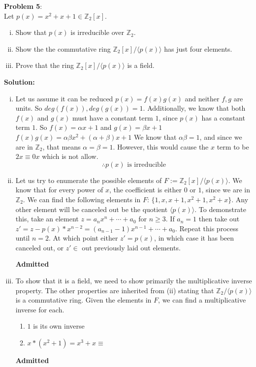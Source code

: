 \documentclass[11pt]{article}
\newcommand{\prob}[3]{\begin{flushleft}
        \textbf{Problem #1}: \\
        #2 
		\textbf{Solution:} 
		#3

\end{flushleft}}
\newcommand{\admit}{
  \begin{flushright}
    \textbf{Admitted}
  \end{flushright}
}
\newcommand{\lr}[1]{
  \langle #1 \rangle
}
\begin{document}
\prob{5}{
Let $p(x) = x^2 + x + 1 \in \mathbb{Z}_2[x]$.
\begin{enumerate}[(i)]
  \item Show that $p(x)$ is irreducible over $\mathbb{Z}_2$.
  \item Show the the commutative ring $\mathbb{Z}_2[x] / \lr{p(x)}$ has just four elements.
  \item Prove that the ring $\mathbb{Z}_2[x] / \lr{p(x)}$ is a field.
\end{enumerate}
}{
\begin{enumerate}[(i)]
  \item Let us assume it can be reduced $p(x) = f(x)g(x)$ and neither $f,g$ are units.
        So $deg(f(x)), deg(g(x)) = 1$.
        Additionally, we know that both $f(x)$ and $g(x)$ must have a constant term $1$, since $p(x)$ has a constant term $1$.
        So $f(x) = \alpha x + 1$ and $g(x) = \beta x + 1$
        $f(x) g(x) = \alpha \beta x^2 + (\alpha + \beta) x + 1$
        We know that $\alpha \beta = 1$, and since we are in $\mathbb{Z}_2$, that means $\alpha = \beta = 1$. However, this would cause the $x$ term to be $2x \equiv 0x$ which is not allow.
        $$\therefore \text{$p(x)$ is irreducible}$$

  \item Let us try to enumerate the possible elements of $F := \mathbb{Z}_2[x] / \lr{p(x)}$.
        We know that for every power of $x$, the coefficient is either $0$ or $1$, since we are in $\mathbb{Z}_2$.
        We can find the following elements in $F$: $\{ 1, x, x + 1, x^2 + 1, x^2 + x \}$.
        Any other element will be canceled out be the quotient $\lr{p(x)}$.
        To demonstrate this, take an element $z = a_n x^n + \cdots + a_0$ for $n \geq 3$.
        If $a_n = 1$ then take out $z' = z - p(x) * x^{n - 2} = (a_{n - 1} - 1)x^{n - 1} + \cdots + a_0$. Repeat this process until $n = 2$. At which point either $z' = p(x)$, in which case it has been canceled out, or $z' \in$ out previously laid out elements.
        \admit

  \item To show that it is a field, we need to show primarily
        the multiplicative inverse property. The other properties are inherited from (ii) stating that $\mathbb{Z}_2 / \lr{p(x)}$ is a commutative ring.
        Given the elements in $F$, we can find a multiplicative inverse for each.
        \begin{enumerate}
          \item $1$ is its own inverse
          \item $x * (x^2 + 1) = x^3 + x \equiv$
        \end{enumerate}
        \admit
\end{enumerate}
}
\end{document}

